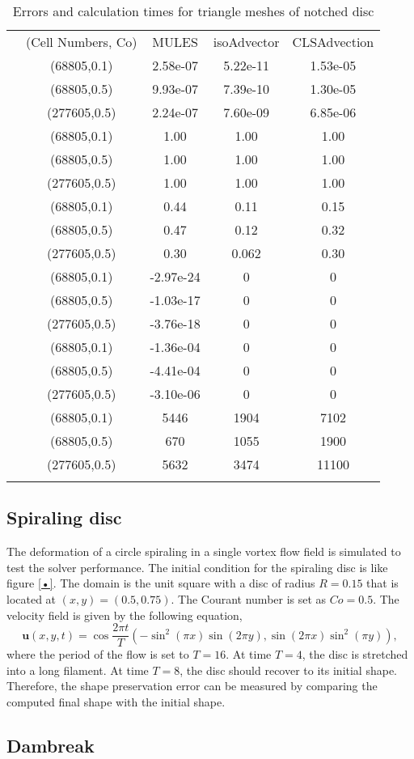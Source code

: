 \begin{table}
\centering
\caption{Errors and calculation times for triangle meshes of notched disc}
\label{Tab:03}
\begin{tabular}{ccccc}
\hline\noalign{\smallskip}
\quad &(Cell Numbers, Co) & MULES &isoAdvector &CLSAdvection  \\
\noalign{\smallskip}\hline\noalign{\smallskip}
\multirow{5}{*}{$\varepsilon_{V}$}
&(68805,0.1)& 2.58e-07 &5.22e-11 &1.53e-05  \\
&(68805,0.5) & 9.93e-07 &7.39e-10 &1.30e-05\\
&(277605,0.5)& 2.24e-07 &7.60e-09 &6.85e-06\\
\hline\noalign{\smallskip}
\multirow{5}{*}{$\varepsilon_{M}$}
&(68805,0.1)& 1.00 &1.00 &1.00  \\
&(68805,0.5) & 1.00 &1.00 &1.00\\
&(277605,0.5)& 1.00 &1.00 &1.00\\
\hline\noalign{\smallskip}
\multirow{5}{*}{$\varepsilon_{S}$}
&(68805,0.1)& 0.44 &0.11 &0.15  \\
&(68805,0.5) & 0.47 &0.12 &0.32\\
&(277605,0.5)& 0.30 &0.062 &0.30\\
\hline\noalign{\smallskip}
\multirow{5}{*}{$\min(\alpha)$}
&(68805,0.1)& -2.97e-24 &0 &0  \\
&(68805,0.5) & -1.03e-17 &0 &0\\
&(277605,0.5)& -3.76e-18 &0 &0\\
\hline\noalign{\smallskip}
\multirow{5}{*}{$\max(\alpha)-1$}
&(68805,0.1)& -1.36e-04 &0 &0  \\
&(68805,0.5) & -4.41e-04 &0 &0\\
&(277605,0.5)& -3.10e-06 &0 &0\\
\hline\noalign{\smallskip}
\multirow{5}{*}{$T_{calc}$}
&(68805,0.1)& 5446 &1904 &7102  \\
&(68805,0.5) & 670 &1055 &1900\\
&(277605,0.5)& 5632 &3474 &11100\\
\noalign{\smallskip}\hline
\end{tabular}
\end{table}

\subsection{Spiraling disc}
The deformation of a circle spiraling in a single vortex flow field is simulated to test the solver performance. The initial condition for the spiraling disc is like figure \ref{•}. The domain is the unit square with a disc of radius $R=0.15$ that is located at $(x,y) = (0.5,0.75)$. The Courant number is set as $Co = 0.5$. The velocity field is given by the following equation,
\begin{equation}
\label{31}
\mathbf{u}(x,y,t)=\cos{\frac{2\pi{t}}{T}}( -\sin^2(\pi{x})\sin(2\pi{y}),\sin(2\pi{x})\sin^2(\pi{y})),
\end{equation}
where the period of the flow is set to $T=16$. At time $T=4$, the disc is stretched into a long filament. At time $T=8$, the disc should recover to its initial shape. Therefore, the shape preservation error can be measured by comparing the computed final shape with the initial shape.

\subsection{Dambreak}